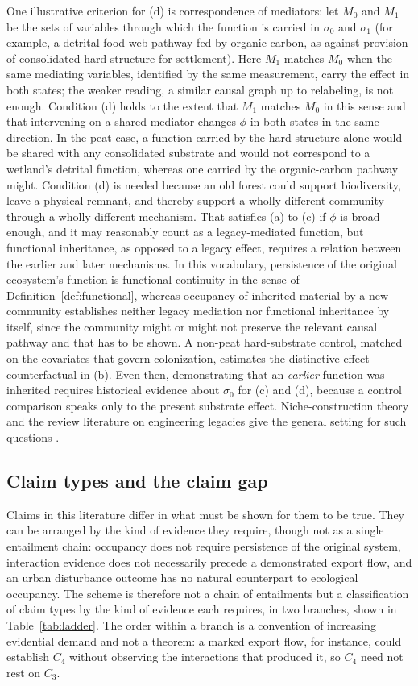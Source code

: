 \documentclass[11pt]{article}
\theoremstyle{definition}
\theoremstyle{remark}
\begin{document}
One illustrative criterion for (d) is correspondence of mediators: let $M_0$ and $M_1$ be the sets of variables through which the function is carried in $\sigma_0$ and $\sigma_1$ (for example, a detrital food-web pathway fed by organic carbon, as against provision of consolidated hard structure for settlement). Here $M_1$ matches $M_0$ when the same mediating variables, identified by the same measurement, carry the effect in both states; the weaker reading, a similar causal graph up to relabeling, is not enough. Condition (d) holds to the extent that $M_1$ matches $M_0$ in this sense and that intervening on a shared mediator changes $\phi$ in both states in the same direction. In the peat case, a function carried by the hard structure alone would be shared with any consolidated substrate and would not correspond to a wetland's detrital function, whereas one carried by the organic-carbon pathway might. Condition (d) is needed because an old forest could support biodiversity, leave a physical remnant, and thereby support a wholly different community through a wholly different mechanism. That satisfies (a) to (c) if $\phi$ is broad enough, and it may reasonably count as a legacy-mediated function, but functional inheritance, as opposed to a legacy effect, requires a relation between the earlier and later mechanisms. In this vocabulary, persistence of the original ecosystem's function is functional continuity in the sense of Definition~\ref{def:functional}, whereas occupancy of inherited material by a new community establishes neither legacy mediation nor functional inheritance by itself, since the community might or might not preserve the relevant causal pathway and that has to be shown. A non-peat hard-substrate control, matched on the covariates that govern colonization, estimates the distinctive-effect counterfactual in (b). Even then, demonstrating that an \emph{earlier} function was inherited requires historical evidence about $\sigma_0$ for (c) and (d), because a control comparison speaks only to the present substrate effect. Niche-construction theory and the review literature on engineering legacies give the general setting for such questions \cite{laland2016,albertson2024}.

\subsection{Claim types and the claim gap}

Claims in this literature differ in what must be shown for them to be true. They can be arranged by the kind of evidence they require, though not as a single entailment chain: occupancy does not require persistence of the original system, interaction evidence does not necessarily precede a demonstrated export flow, and an urban disturbance outcome has no natural counterpart to ecological occupancy. The scheme is therefore not a chain of entailments but a classification of claim types by the kind of evidence each requires, in two branches, shown in Table~\ref{tab:ladder}. The order within a branch is a convention of increasing evidential demand and not a theorem: a marked export flow, for instance, could establish $C_4$ without observing the interactions that produced it, so $C_4$ need not rest on $C_3$.
\end{document}
